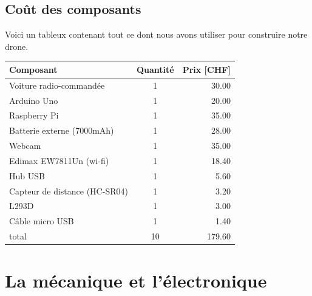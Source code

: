 \documentclass[a4paper,11pt]{report}
\begin{document}
{\section{Coût des composants}
Voici un tableux contenant tout ce dont nous avons utiliser pour construire notre drone.
\begin{table}
\begin{tabular}{| l | c | r |}
\hline
Composant & Quantité & Prix [CHF] \\
\hline
Voiture radio-commandée & 1 & 30.00\\
\hline
Arduino Uno & 1 & 20.00 \\
\hline
Raspberry Pi& 1 & 35.00 \\
\hline
Batterie externe (7000mAh) &1 & 28.00 \\
\hline
Webcam & 1 & 35.00\\
\hline
Edimax EW7811Un (wi-fi) & 1 & 18.40\\
\hline
Hub USB & 1 & 5.60\\
\hline
Capteur de distance (HC-SR04) & 1 & 3.20\\
\hline
L293D & 1 & 3.00\\
\hline
Câble micro USB & 1 & 1.40\\
\hline


\hline
\hline
total & 10 & 179.60\\
\hline

\end{tabular}
\end{table}
\chapter{La mécanique et l'électronique}


}
\end{document}

